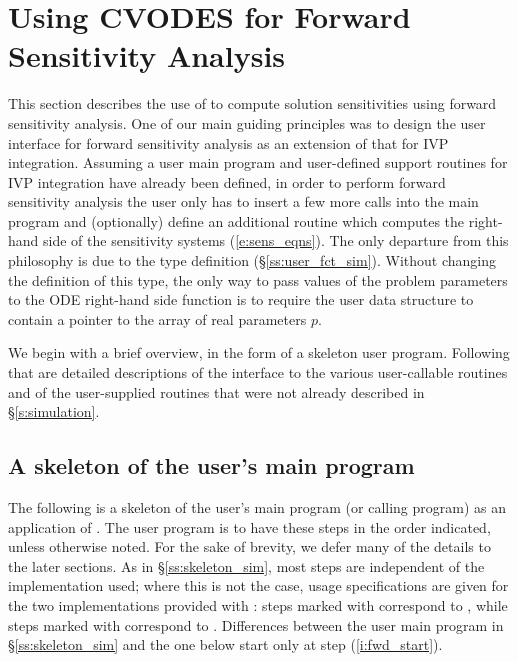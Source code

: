 \chapter{Using CVODES for Forward Sensitivity Analysis}\label{s:forward}

This section describes the use of {\cvodes} to compute solution sensitivities using
forward sensitivity analysis. One of our main guiding principles was to design 
the {\cvodes} user interface for forward sensitivity analysis as an extension of
that for IVP integration. Assuming a user main program and user-defined support 
routines for IVP integration have already been defined, in order to perform 
forward sensitivity analysis the user only has to insert a few more calls 
into the main program and (optionally) define an additional routine which
computes the right-hand side of the sensitivity systems (\ref{e:sens_eqns}). 
The only departure from this philosophy is due to the  type definition
(\S\ref{ss:user_fct_sim}). Without changing the definition of this type, the
only way to pass values of the problem parameters to the ODE right-hand side
function is to require the user data structure  to contain a pointer
to the array of real parameters $p$.

We begin with a brief overview, in the form of a skeleton user program.
Following that are detailed descriptions of the interface to the
various user-callable routines and of the user-supplied routines that were not already
described in \S\ref{s:simulation}.

\section{A skeleton of the user's main program}\label{s:forward_usage}

The following is a skeleton of the user's main program (or calling
program) as an application of {\cvodes}. The user program is to have these 
steps in the order indicated, unless otherwise noted.
For the sake of brevity, we defer many of the details to the later sections.
As in \S\ref{ss:skeleton_sim}, most steps are independent of the {\nvector}
implementation used; where this is not the case, usage specifications are given for the
two implementations provided with {\cvodes}: steps marked with {\p} correspond to 
{\nvecp}, while steps marked with {\s} correspond to {\nvecs}.
Differences between the user main program in \S\ref{ss:skeleton_sim} and
the one below start only at step (\ref{i:fwd_start}).

